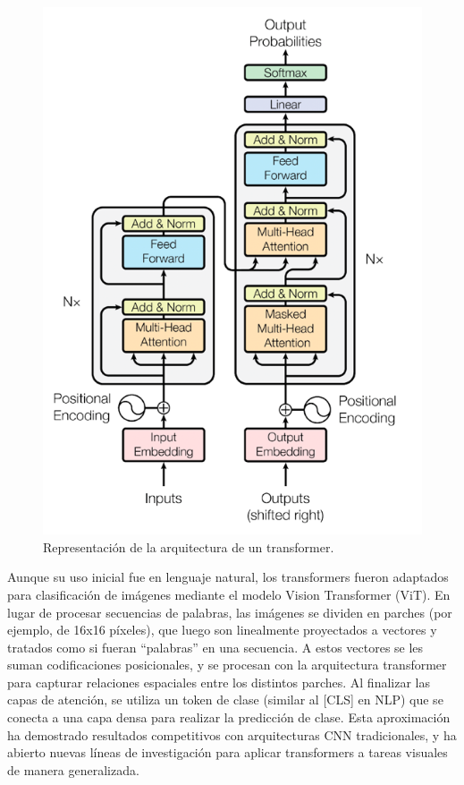 \begin{figure}[h!] 
    \includegraphics[width=1\textwidth]{images/transformer.png} 
    \centering 
    \caption{Representación de la arquitectura de un transformer\protect\cite{AmazonWebServices2024}.} 
    \label{Image:transformer} 
\end{figure}

Aunque su uso inicial fue en lenguaje natural, los 
transformers fueron adaptados para clasificación de imágenes 
mediante el modelo Vision Transformer (ViT)\cite{Dosovitskiy2020}. En lugar de 
procesar secuencias de palabras, las imágenes se dividen en 
parches (por ejemplo, de 16x16 píxeles), que luego son 
linealmente proyectados a vectores y tratados como si fueran 
``palabras'' en una secuencia. A estos vectores se les 
suman codificaciones posicionales, y se procesan con la 
arquitectura transformer para capturar relaciones espaciales 
entre los distintos parches. Al finalizar las capas de 
atención, se utiliza un token de clase (similar al [CLS] 
en NLP) que se conecta a una capa densa para realizar la 
predicción de clase. Esta aproximación ha demostrado 
resultados competitivos con arquitecturas CNN tradicionales, 
y ha abierto nuevas líneas de investigación para aplicar 
transformers a tareas visuales de manera generalizada.

